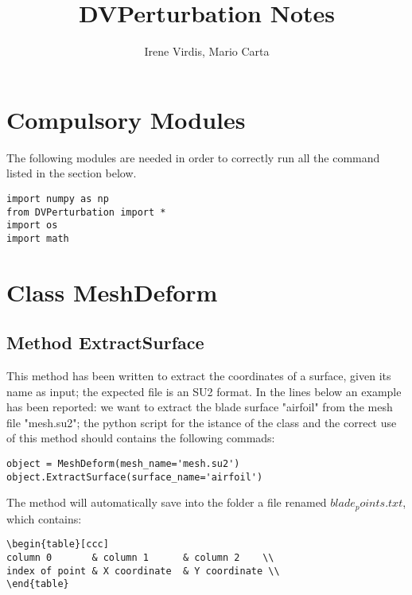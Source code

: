 \documentclass[12pt]{article}
\title{DVPerturbation Notes}
\author{Irene Virdis, Mario Carta}
\begin{document}
\maketitle
\section{Compulsory Modules}
The following modules are needed in order to correctly run all the command listed in the section below.

\begin{verbatim}
import numpy as np
from DVPerturbation import *
import os
import math
\end{verbatim}

\section{Class MeshDeform}
\subsection{Method ExtractSurface}
This method has been written to extract the coordinates of a surface, given its name as input; the expected file is an SU2 format.
In the lines below an example has been reported: we want to extract the blade surface "airfoil" from the mesh file "mesh.su2"; the python script for the istance of the class and the correct use of this method should contains the following commads:
\begin{verbatim}
object = MeshDeform(mesh_name='mesh.su2')
object.ExtractSurface(surface_name='airfoil')
\end{verbatim}

The method will automatically save into the folder a file renamed \textit{$blade_ points.txt$}, which contains: 
\begin{verbatim}
\begin{table}[ccc]
column 0       & column 1      & column 2    \\
index of point & X coordinate  & Y coordinate \\
\end{table}
\end{verbatim}
\end{document}
